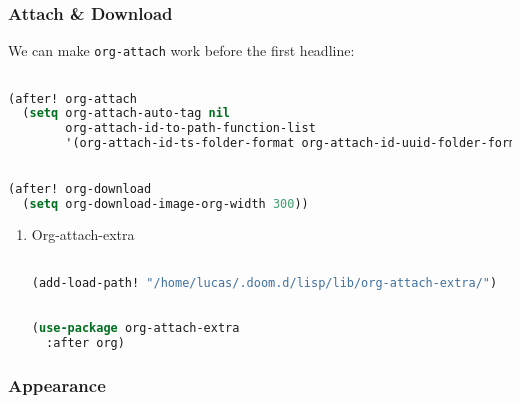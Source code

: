 \documentclass[11pt]{article}
\begin{document}
\subsubsection{Attach \& Download}
\label{sec:attach-download}
We can make \texttt{org-attach} work before the first headline:

\begin{lstlisting}[language=Lisp]%! Someone please complete this list for me

(after! org-attach
  (setq org-attach-auto-tag nil
        org-attach-id-to-path-function-list
        '(org-attach-id-ts-folder-format org-attach-id-uuid-folder-format identity)))
\end{lstlisting}

\begin{lstlisting}[language=Lisp]%! Someone please complete this list for me

(after! org-download
  (setq org-download-image-org-width 300))
\end{lstlisting}

\begin{enumerate}
  \item Org-attach-extra
  \label{sec:org-attach-extra}

  \begin{lstlisting}[language=Lisp]%! Someone please complete this list for me

(add-load-path! "/home/lucas/.doom.d/lisp/lib/org-attach-extra/")
\end{lstlisting}

\begin{lstlisting}[language=Lisp]%! Someone please complete this list for me

(use-package org-attach-extra
  :after org)
\end{lstlisting}
\end{enumerate}

\subsubsection{Appearance}
\label{sec:appearance}
\end{document}
